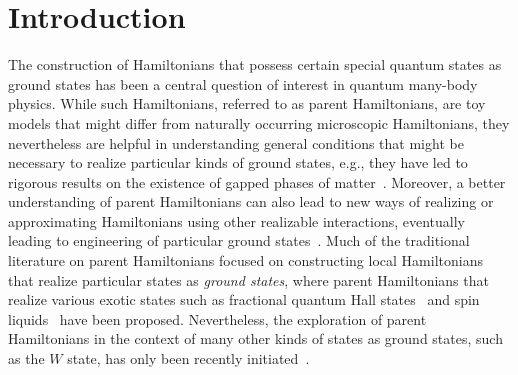\documentclass[prx,letterpaper,aps,superscriptaddress,floatfix,twocolumn,nofootinbib]{revtex4-2}
\theoremstyle{definition}
\begin{document}
\section{Introduction}
%

%
The construction of Hamiltonians that possess certain special quantum states as ground states has been a central question of interest in quantum many-body physics. 
%
While such Hamiltonians, referred to as parent Hamiltonians, are toy models that might differ from naturally occurring microscopic Hamiltonians, they nevertheless are helpful in understanding general conditions that might be necessary to realize particular kinds of ground states, e.g., they have led to rigorous results on the existence of gapped phases of matter~\cite{AffleckKennedyLiebTasaki1988, FannesNachtergaeleWerner1992,  Perez-Garcia2007, PerezGarciaVerstraeteCiracWolf2008,PhysRevB.72.045141}.
%
Moreover, a better understanding of parent Hamiltonians can also lead to new ways of realizing or approximating Hamiltonians using other realizable interactions, eventually leading to engineering of particular ground states~\cite{chertkovclark2018}.  
%
Much of the traditional literature on parent Hamiltonians focused on constructing local Hamiltonians that realize particular states as \textit{ground states}, where parent Hamiltonians that realize various exotic states such as fractional quantum Hall states~\cite{haldane1983fractional, bernevig2008model, kapit2010exact, lee2015geometric} and spin liquids~\cite{thomale2009parent, greiter2014parent, zhou2017qsl} have been proposed.
%
Nevertheless, the exploration of parent Hamiltonians in the context of many other kinds of states as ground states, such as the $W$ state, has only been recently initiated~\cite{gioia2024wstateuniqueground}.
%
\end{document}
